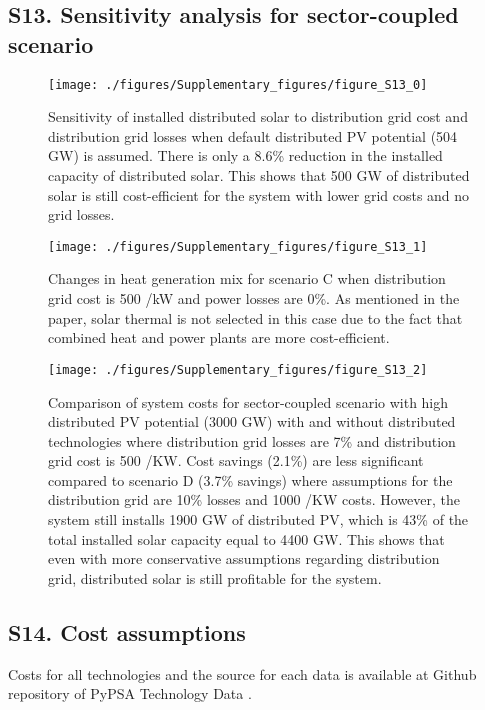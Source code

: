 \subsection*{S13. Sensitivity analysis for sector-coupled scenario}

\begin{figure}[H]
\renewcommand*{\thefigure}{S\arabic{figure}}
\texttt{[image: ./figures/Supplementary\_figures/figure\_S13\_0]}
\caption{Sensitivity of installed distributed solar to distribution grid cost and distribution grid losses when default distributed PV potential (504 GW) is assumed. There is only a 8.6\% reduction in the installed capacity of distributed solar. This shows that 500 GW of distributed solar is still cost-efficient for the system with lower grid costs and no grid losses.  }
\end{figure}

\begin{figure}[H]
\renewcommand*{\thefigure}{S\arabic{figure}}
\texttt{[image: ./figures/Supplementary\_figures/figure\_S13\_1]}
\caption{Changes in heat generation mix for scenario C when distribution grid cost is 500 \texteuro /kW and power losses are 0\%. As mentioned in the paper, solar thermal is not selected in this case due to the fact that combined heat and power plants are more cost-efficient. }
\end{figure}

\begin{figure}[H]
\renewcommand*{\thefigure}{S\arabic{figure}}
\texttt{[image: ./figures/Supplementary\_figures/figure\_S13\_2]}
\caption{Comparison of system costs for sector-coupled scenario with high distributed PV potential (3000 GW) with and without distributed technologies where distribution grid losses are 7\% and distribution grid cost is 500 \texteuro /KW. Cost savings (2.1\%) are less significant compared to scenario D (3.7\% savings) where assumptions for the distribution grid are 10\% losses and 1000 \texteuro /KW costs. However, the system still installs 1900 GW of distributed PV, which is 43\% of the total installed solar capacity equal to 4400 GW. This shows that even with more conservative assumptions regarding distribution grid, distributed solar is still profitable for the system. }
\end{figure}



\subsection*{S14. Cost assumptions}
Costs for all technologies and the source for each data is available at Github repository of PyPSA Technology Data .

